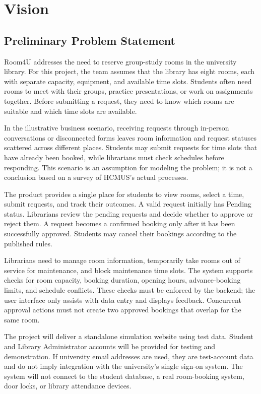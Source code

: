 \section{Vision}

\subsection{Preliminary Problem Statement}
Room4U addresses the need to reserve group-study rooms in the university library. For this project, the team assumes that the library has eight rooms, each with separate capacity, equipment, and available time slots. Students often need rooms to meet with their groups, practice presentations, or work on assignments together. Before submitting a request, they need to know which rooms are suitable and which time slots are available.

In the illustrative business scenario, receiving requests through in-person conversations or disconnected forms leaves room information and request statuses scattered across different places. Students may submit requests for time slots that have already been booked, while librarians must check schedules before responding. This scenario is an assumption for modeling the problem; it is not a conclusion based on a survey of HCMUS's actual processes.

The product provides a single place for students to view rooms, select a time, submit requests, and track their outcomes. A valid request initially has Pending status. Librarians review the pending requests and decide whether to approve or reject them. A request becomes a confirmed booking only after it has been successfully approved. Students may cancel their bookings according to the published rules.

Librarians need to manage room information, temporarily take rooms out of service for maintenance, and block maintenance time slots. The system supports checks for room capacity, booking duration, opening hours, advance-booking limits, and schedule conflicts. These checks must be enforced by the backend; the user interface only assists with data entry and displays feedback. Concurrent approval actions must not create two approved bookings that overlap for the same room.

The project will deliver a standalone simulation website using test data. Student and Library Administrator accounts will be provided for testing and demonstration. If university email addresses are used, they are test-account data and do not imply integration with the university's single sign-on system. The system will not connect to the student database, a real room-booking system, door locks, or library attendance devices.


